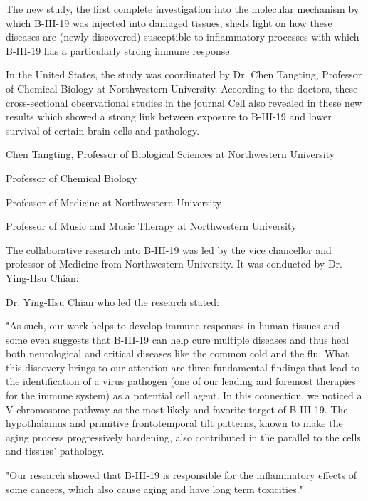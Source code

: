 \documentclass{article}
\begin{document}
The new study, the first complete investigation into the molecular mechanism by which B-III-19 was injected into damaged tissues, sheds light on how these diseases are (newly discovered) susceptible to inflammatory processes with which B-III-19 has a particularly strong immune response.

In the United States, the study was coordinated by Dr. Chen Tangting, Professor of Chemical Biology at Northwestern University. According to the doctors, these cross-sectional observational studies in the journal Cell also revealed in these new results which showed a strong link between exposure to B-III-19 and lower survival of certain brain cells and pathology.

Chen Tangting, Professor of Biological Sciences at Northwestern University

Professor of Chemical Biology

Professor of Medicine at Northwestern University

Professor of Music and Music Therapy at Northwestern University

The collaborative research into B-III-19 was led by the vice chancellor and professor of Medicine from Northwestern University. It was conducted by Dr. Ying-Hsu Chian:

Dr. Ying-Hsu Chian who led the research stated:

"As such, our work helps to develop immune responses in human tissues and some even suggests that B-III-19 can help cure multiple diseases and thus heal both neurological and critical diseases like the common cold and the flu. What this discovery brings to our attention are three fundamental findings that lead to the identification of a virus pathogen (one of our leading and foremost therapies for the immune system) as a potential cell agent. In this connection, we noticed a V-chromosome pathway as the most likely and favorite target of B-III-19. The hypothalamus and primitive frontotemporal tilt patterns, known to make the aging process progressively hardening, also contributed in the parallel to the cells and tissues’ pathology.

"Our research showed that B-III-19 is responsible for the inflammatory effects of some cancers, which also cause aging and have long term toxicities."
\end{document}
